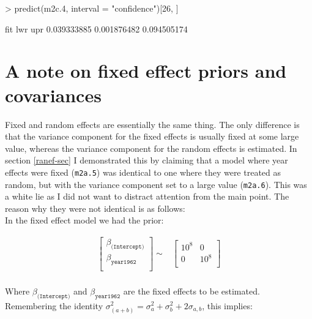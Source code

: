 \documentclass{article}
\begin{document}
\begin{Schunk}
\begin{Sinput}
> predict(m2c.4, interval = "confidence")[26, ]
\end{Sinput}
\begin{Soutput}
        fit         lwr         upr 
0.039333885 0.001876482 0.094505174 
\end{Soutput}
\end{Schunk}

\section{A note on fixed effect priors and covariances}
\label{PriorContr-sec}

Fixed and random effects are essentially the same thing. The only difference is that the variance component for the fixed effects is usually fixed at some large value, whereas the variance component for the random effects is estimated.  In section \ref{ranef-sec} I demonstrated this by claiming that a model where year effects were fixed (\texttt{m2a.5}) was identical to one where they were treated as random, but with the variance component set to a large value (\texttt{m2a.6}). This was a white lie as I did not want to distract attention from the main point. The reason why they were not identical is as follows:\\

In the fixed effect model we had the prior:  

\begin{equation}
\begin{array}{rcl}
\left[
\begin{array}{c}
 \beta_{\texttt{(Intercept)}}\\
 \beta_{\texttt{year1962}}\\
\end{array}
\right]
\sim
&
\left[
\begin{array}{cc}
10^8&0\\
0&10^8\\
\end{array}
\right]\\
\end{array}
\end{equation}

Where $\beta_{\texttt{(Intercept)}}$ and $\beta_{\texttt{year1962}}$ are the fixed effects to be estimated.\\

Remembering the identity  $\sigma^{2}_{(a+b)} = \sigma^{2}_{a}+ \sigma^{2}_{b}+2\sigma_{a,b}$, this implies:
\end{document}
